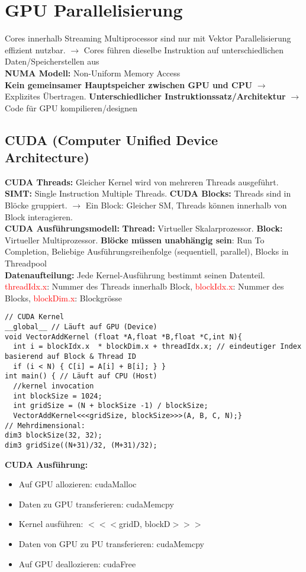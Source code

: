 
\section{GPU Parallelisierung}
Cores innerhalb Streaming Multiprocessor sind nur mit Vektor Parallelisierung
effizient nutzbar. $\rightarrow$ Cores führen dieselbe Instruktion auf unterschiedlichen Daten/Speicherstellen aus\\
\textcolor{b}{\textbf{NUMA Modell:}} Non-Uniform Memory Access\\
\textbf{Kein gemeinsamer Hauptspeicher zwischen GPU und CPU} $\rightarrow$ Explizites Übertragen. \textbf{Unterschiedlicher Instruktionssatz/Architektur} $\rightarrow$ Code für GPU kompilieren/designen
\subsection{CUDA (Computer Unified Device Architecture)}
\textbf{CUDA Threads:} Gleicher Kernel wird von mehreren Threads ausgeführt. \textbf{SIMT:} Single Instruction Multiple Threads. \textbf{CUDA Blocks:} Threads sind in Blöcke gruppiert. $\rightarrow$ Ein Block: Gleicher SM, Threads können innerhalb von Block interagieren.\\
\textcolor{b}{\textbf{CUDA Ausführungsmodell:}} \textbf{Thread:} Virtueller Skalarprozessor. \textbf{Block:} Virtueller Multiprozessor. \textbf{Blöcke müssen unabhängig sein}: Run To Completion, Beliebige Ausführungsreihenfolge (sequentiell, parallel), Blocks in Threadpool\\
\textcolor{b}{\textbf{Datenaufteilung:}} Jede Kernel-Ausführung bestimmt seinen Datenteil. \textcolor{red}{threadIdx.x}: Nummer des Threads innerhalb Block, \textcolor{red}{blockIdx.x}: Nummer des Blocks, \textcolor{red}{blockDim.x}: Blockgrösse
\begin{lstlisting}
// CUDA Kernel
__global__ // Läuft auf GPU (Device)
void VectorAddKernel (float *A,float *B,float *C,int N){
  int i = blockIdx.x  * blockDim.x + threadIdx.x; // eindeutiger Index basierend auf Block & Thread ID
  if (i < N) { C[i] = A[i] + B[i]; } }
int main() { // Läuft auf CPU (Host)
  //kernel invocation
  int blockSize = 1024;
  int gridSize = (N + blockSize -1) / blockSize;
  VectorAddKernel<<<gridSize, blockSize>>>(A, B, C, N);}
// Mehrdimensional:
dim3 blockSize(32, 32);
dim3 gridSize((N+31)/32, (M+31)/32);
\end{lstlisting}
\textcolor{b}{\textbf{CUDA Ausführung:}}
\begin{itemize}[topsep=0pt, leftmargin=3mm]
    \setlength\itemsep{-0.3em}
    \item Auf GPU allozieren: cudaMalloc
    \item Daten zu GPU transferieren: cudaMemcpy
    \item Kernel ausführen: $<<<$gridD, blockD$>>>$
    \item Daten von GPU zu PU transferieren: cudaMemcpy
    \item Auf GPU deallozieren: cudaFree
\end{itemize}
